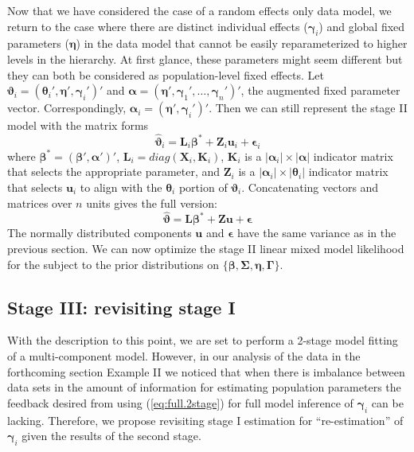 \documentclass[12pt]{article}
\newcommand{\bt}{\boldsymbol{\theta}}
\newcommand{\bvt}{\boldsymbol{\vartheta}}
\newcommand{\bb}{\boldsymbol{\beta}}
\newcommand{\bn}{\boldsymbol{\eta}}
\newcommand{\bg}{\boldsymbol{\gamma}}
\newcommand{\bG}{\boldsymbol{\Gamma}}
\newcommand{\bSig}{\boldsymbol{\Sigma}}
\newcommand{\ba}{\boldsymbol{\alpha}}
\newcommand{\bL}{\mathbf{L}}
\newcommand{\bK}{\mathbf{K}}
\newcommand{\bX}{\mathbf{X}}
\newcommand{\bZ}{\mathbf{Z}}
\newcommand{\bu}{\mathbf{u}}
\begin{document}
Now that we have considered the case of a random effects only data model, we return to the case where there are distinct individual effects ($\bg_i$) and global fixed parameters ($\bn$) in the data model that cannot be easily reparameterized to higher levels in the hierarchy. At first glance, these parameters might seem different but they can both be considered as population-level fixed effects. Let $\bvt_i = (\bt_i', \bn', \bg_i')'$ and $\ba = (\bn', \bg_1',\dots,\bg_n')'$, the augmented fixed parameter vector. Correspondingly, $\ba_i = (\bn', \bg_i')'$. Then we can still represent the stage II model with the matrix forms
\[
\hat{\bvt}_i = \bL_i\bb^* + \bZ_i\bu_i + \boldsymbol{\epsilon}_i
\]
where $\bb^* = (\bb', \ba')'$, $\bL_i = diag(\bX_i, \bK_i)$, $\bK_i$ is a $|\ba_i|\times |\ba|$ indicator matrix that selects the appropriate parameter, and $\bZ_i$ is a $|\ba_i|\times |\bt_i|$ indicator matrix that selects $\bu_i$ to align with the $\bt_i$ portion of $\bvt_i$. Concatenating vectors and matrices over $n$ units gives the full version:
\begin{equation}\label{eq:full2stage}
\hat{\bvt} = \bL\bb^* + \bZ\bu + \boldsymbol{\epsilon}
\end{equation}
The normally distributed components $\bu$ and $\boldsymbol{\epsilon}$ have the same variance as in the previous section. We can now optimize the stage II linear mixed model likelihood for the subject to the prior distributions on $\{\bb, \bSig, \bn, \bG\}$.   


\subsection{Stage III: revisiting stage I}  

With the description to this point, we are set to perform a 2-stage model fitting of a multi-component model. However, in our analysis of the data in the forthcoming section Example II we noticed that when there is imbalance between data sets in the amount of information for estimating population parameters the feedback desired from using (\ref{eq:full.2stage}) for full model inference of $\bg_i$ can be lacking. Therefore, we propose revisiting stage I estimation for ``re-estimation'' of $\bg_i$ given the results of the second stage. 
\end{document}
